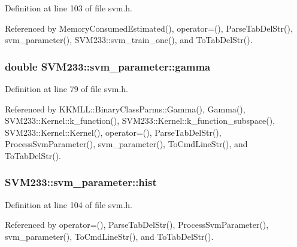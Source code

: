 Definition at line 103 of file svm.\+h.



Referenced by Memory\+Consumed\+Estimated(), operator=(), Parse\+Tab\+Del\+Str(), svm\+\_\+parameter(), S\+V\+M233\+::svm\+\_\+train\+\_\+one(), and To\+Tab\+Del\+Str().

\subsubsection[{\texorpdfstring{gamma}{gamma}}]{\setlength{\rightskip}{0pt plus 5cm}double S\+V\+M233\+::svm\+\_\+parameter\+::gamma}\hypertarget{struct_s_v_m233_1_1svm__parameter_a39ac3a8cfe2358a6e58ef83ad301019a}{}\label{struct_s_v_m233_1_1svm__parameter_a39ac3a8cfe2358a6e58ef83ad301019a}


Definition at line 79 of file svm.\+h.



Referenced by K\+K\+M\+L\+L\+::\+Binary\+Class\+Parms\+::\+Gamma(), Gamma(), S\+V\+M233\+::\+Kernel\+::k\+\_\+function(), S\+V\+M233\+::\+Kernel\+::k\+\_\+function\+\_\+subspace(), S\+V\+M233\+::\+Kernel\+::\+Kernel(), operator=(), Parse\+Tab\+Del\+Str(), Process\+Svm\+Parameter(), svm\+\_\+parameter(), To\+Cmd\+Line\+Str(), and To\+Tab\+Del\+Str().

\subsubsection[{\texorpdfstring{hist}{hist}}]{ S\+V\+M233\+::svm\+\_\+parameter\+::hist}\hypertarget{struct_s_v_m233_1_1svm__parameter_a75623b8d630173a2333f37081e94ff13}{}\label{struct_s_v_m233_1_1svm__parameter_a75623b8d630173a2333f37081e94ff13}


Definition at line 104 of file svm.\+h.



Referenced by operator=(), Parse\+Tab\+Del\+Str(), Process\+Svm\+Parameter(), svm\+\_\+parameter(), To\+Cmd\+Line\+Str(), and To\+Tab\+Del\+Str().

